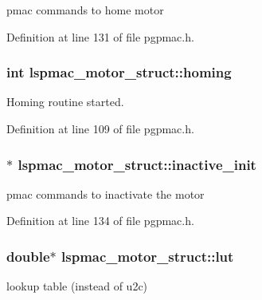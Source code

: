 pmac commands to home motor 



Definition at line 131 of file pgpmac.\-h.

\hypertarget{structlspmac__motor__struct_aa74108855693f94fc2ff76333c9fb6ac}{
\subsubsection[{homing}]{\setlength{\rightskip}{0pt plus 5cm}int lspmac\-\_\-motor\-\_\-struct\-::homing}}\label{structlspmac__motor__struct_aa74108855693f94fc2ff76333c9fb6ac}


Homing routine started. 



Definition at line 109 of file pgpmac.\-h.

\hypertarget{structlspmac__motor__struct_ab329ce9b277eca9984c18417dece7bf7}{
\subsubsection[{inactive\-\_\-init}]{$\ast$ lspmac\-\_\-motor\-\_\-struct\-::inactive\-\_\-init}}\label{structlspmac__motor__struct_ab329ce9b277eca9984c18417dece7bf7}


pmac commands to inactivate the motor 



Definition at line 134 of file pgpmac.\-h.

\hypertarget{structlspmac__motor__struct_a7b43671f7f3e06521f6cf91fb9ac707d}{
\subsubsection[{lut}]{\setlength{\rightskip}{0pt plus 5cm}double$\ast$ lspmac\-\_\-motor\-\_\-struct\-::lut}}\label{structlspmac__motor__struct_a7b43671f7f3e06521f6cf91fb9ac707d}


lookup table (instead of u2c) 




